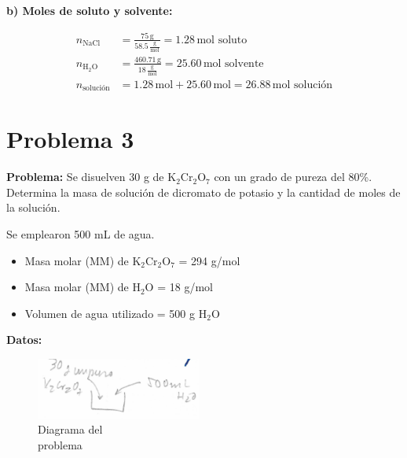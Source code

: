 \documentclass{article}
\begin{document}
\textbf{b) Moles de soluto y solvente:}

\begin{align*}
    n_{\text{NaCl}} &= \frac{75 \, \text{g}}{58.5 \, \frac{\text{g}}{\text{mol}}} = 1.28 \, \text{mol soluto} \\[10pt]
    n_{\text{H}_2\text{O}} &= \frac{460.71 \, \text{g}}{18 \, \frac{\text{g}}{\text{mol}}} = 25.60 \, \text{mol solvente} \\[10pt]
    n_{\text{solución}} &= 1.28 \, \text{mol} + 25.60 \, \text{mol} = 26.88 \, \text{mol solución}
\end{align*}










\newpage
\section*{Problema 3}
\textbf{Problema:}
Se disuelven 30 g de K$_2$Cr$_2$O$_7$ con un grado de pureza del 80\%. Determina la masa de solución de dicromato de potasio y la cantidad de moles de la solución.

Se emplearon 500 mL de agua.

\begin{itemize} \item Masa molar (MM) de K$_2$Cr$_2$O$_7$ = 294 g/mol \item Masa molar (MM) de H$_2$O = 18 g/mol \item Volumen de agua utilizado = 500 g H$_2$O \end{itemize}


\noindent\textbf{Datos:} %

\begin{figure}[H]
    \begin{minipage}[t]{0.3\textwidth} %
        \raggedright %
        \includegraphics[width=\linewidth, height=2cm]{./problema3_diagrama.png} %
        \caption{Diagrama del \\ problema}
    \end{minipage}
\end{figure}
\end{document}
